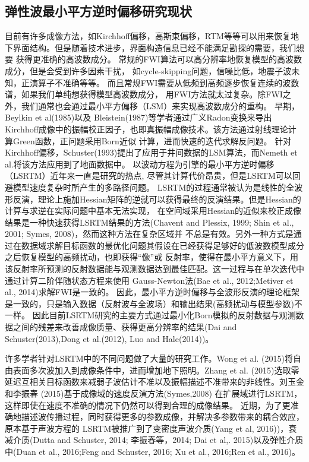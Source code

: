 \subsection{弹性波最小平方逆时偏移研究现状}

目前有许多成像方法，如Kirchhoff偏移，高斯束偏移，RTM等等可以用来恢复地下界面结构。但是随着技术进步，界面构造信息已经不能满足勘探的需要，我们想要
获得更准确的高波数成分。
常规的FWI算法可以高分辨率地恢复模型的高波数成分，但是会受到许多因素干扰，
如cycle-skipping问题，信噪比低，地震子波未知，正演算子不准确等等。
而且常规FWI需要从低频到高频逐步恢复连续的波数谱，如果我们单纯想获得模型高波数成分，
用FWI方法就太过复杂。除FWI之外，我们通常也会通过最小平方偏移（LSM）来实现高波数成分的重构。
早期，Beylkin
et al(1985)\cite{BeylkinEtAl1985}以及
Bleistein(1987)\cite{Bleistein1987}等学者通过广义Radon变换来导出Kirchhoff成像中的振幅校正因子，也即真振幅成像技术。该方法通过射线理论计算Green函数，正问题采用Born近似
计算，进而快速的迭代求解反问题。
针对Kirchhoff偏移，Schuster(1993)\cite{Schuster1993}提出了应用于井间数据的LSM算法，而Nemeth et al.\cite{Nemeth1999}将该方法应用到了地面数据中。
以波动方程为引擎的最小平方逆时偏移（LSRTM）近年来一直是研究的热点,
尽管其计算代价昂贵，但是LSRTM可以回避模型速度复杂时所产生的多路径问题。
LSRTM的过程通常被认为是线性的全波形反演，理论上施加Hessian矩阵的逆就可以获得最终的反演结果。但是Hessian的计算与求逆在实际问题中基本无法实现，
在空间域采用Hessian的近似来校正成像结果是一种快速获得LSRTM结果的方法(Chavent and Plessix, 
1999\cite{ChaventEtAl1999}; Shin et al., 2001\cite{shin2001improved}; Symes,
2008\cite{Symes2008})，然而这种方法在复杂区域并
不总是有效。另外一种方式是通过在数据域求解目标函数的最优化问题其假设在已经获得足够好的低波数模型成分之后恢复模型的高频扰动，也即获得“像”或
反射率，使得在最小平方意义下，用该反射率所预测的反射数据能与观测数据达到最佳匹配。这一过程与在单次迭代中通过计算二阶伴随状态方程来使用
Gauss-Newton法(Bae et al., 2012\cite{bae2012frequency};Metiver et al.,
2014\cite{Metivier2014})求解FWI是一致的。
因此，最小平方逆时偏移与全波形反演的理论框架是一致的，只是输入数据（反射波与全波场）和输出结果(高频扰动与模型参数)不一样。
因此目前LSRTM研究的主要方式通过最小化Born模拟的反射数据与观测数据之间的残差来改善成像质量、获得更高分辨率的结果(Dai and
Schuster(2013)\cite{Dai2013},Dong et al.(2012)\cite{Dong2012}, Luo and
Hale(2014)\cite{Luo2014})。

许多学者针对LSRTM中的不同问题做了大量的研究工作。Wong et al.
(2015)\cite{WongEtAl2015}将自由表面多次波加入到成像条件中，进而增加地下照明。Zhang et al.
(2015)\cite{ZhangEtAl2015}选取零延迟互相关目标函数来减弱子波估计不准以及振幅描述不准带来的非线性。刘玉金和李振春
(2015)\cite{刘玉金2015}基于成像域的速度反演方法(Symes,2008\cite{Symes2008a})
在扩展域进行LSRTM，这样即使在速度不准确的情况下仍然可以得到合理的成像结果。
近期，为了更准确地描述波传播过程，同时获得更多的参数成像，并解决多参数带来的耦合效应，原本基于声波方程的
LSRTM被推广到了变密度声波介质(Yang et al, 2016)\cite{Yang2016})，衰减介质(Dutta and
Schuster, 2014\cite{DuttaEtAl2014}; 李振春等，2014\cite{李振春2014}; Dai et al,.
2015\cite{Dai2015})以及弹性介质中(Duan et al., 2016\cite{Duan2016};Feng and Schuster,
2016\cite{Feng2016}; Xu et al., 2016\cite{Xu2016};Ren et al., 2016\cite{RenEtAl2016})。


